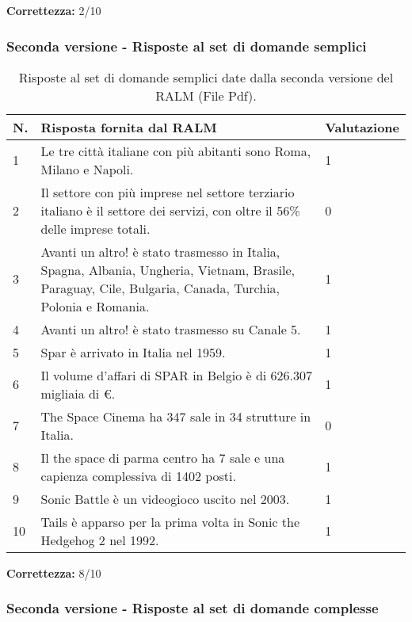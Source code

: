 \textbf{Correttezza:} 2/10

\subsubsection{Seconda versione - Risposte al set di domande semplici}

\begin{table}[H]
    \centering
    \begin{tabular}{|p{0.5cm} |p{6cm} |p{2cm}|}
        \hline
        \textbf{N}. & \textbf{Risposta fornita dal RALM} & \textbf{Valutazione} \\
        \hline
        1 & Le tre città italiane con più abitanti sono Roma, Milano e Napoli. & 1 \\
        \hline
        2 & Il settore con più imprese nel settore terziario italiano è il settore dei servizi, con oltre il 56\% delle imprese totali. & 0 \\
        \hline
        3 & Avanti un altro! è stato trasmesso in Italia, Spagna, Albania, Ungheria, Vietnam, Brasile, Paraguay, Cile, Bulgaria, Canada, Turchia, Polonia e Romania. & 1 \\
        \hline
        4 & Avanti un altro! è stato trasmesso su Canale 5. & 1 \\
        \hline
        5 & Spar è arrivato in Italia nel 1959. & 1 \\
        \hline
        6 & Il volume d'affari di SPAR in Belgio è di 626.307 migliaia di €. & 1 \\
        \hline
        7 & The Space Cinema ha 347 sale in 34 strutture in Italia. & 0 \\
        \hline
        8 & Il the space di parma centro ha 7 sale e una capienza complessiva di 1402 posti. & 1 \\
        \hline
        9 & Sonic Battle è un videogioco uscito nel 2003. & 1 \\
        \hline
        10 & Tails è apparso per la prima volta in Sonic the Hedgehog 2 nel 1992. & 1 \\
        \hline
    \end{tabular}
    \caption{Risposte al set di domande semplici date dalla seconda versione del RALM (File Pdf).}
    \label{tab:dSempPdfSec}
\end{table}

\textbf{Correttezza:} 8/10

\subsubsection{Seconda versione - Risposte al set di domande complesse}

